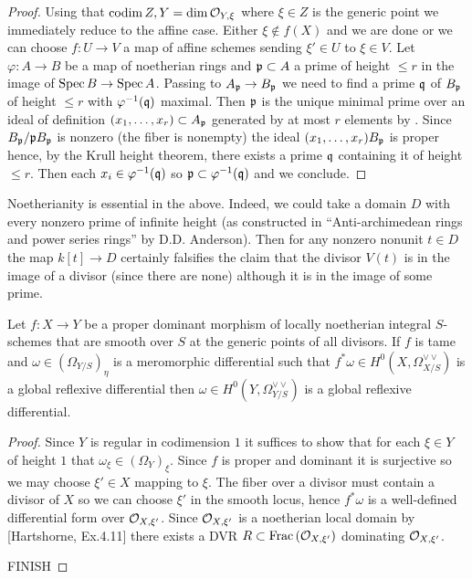 \documentclass[main.tex]{subfiles}
\begin{document}
\begin{proof}
Using that $\operatorname{\mathrm{codim}}{Z,Y} = \dim{\mathcal{O}_{Y, \xi}}$ where $\xi \in Z$ is the generic point we immediately reduce to the affine case. Either $\xi \notin f(X)$ and we are done or we can choose $f : U \to V$ a map of affine schemes sending $\xi' \in U$ to $\xi \in V$. Let $\varphi : A \to B$ be a map of noetherian rings and $\mathfrak{p} \subset A$ a prime of height $\le r$ in the image of $\operatorname{\mathrm{Spec}}{B} \to \operatorname{\mathrm{Spec}}{A}$. Passing to $A_{\mathfrak{p}} \to B_{\mathfrak{p}}$ we need to find a prime $\mathfrak{q}$ of $B_{\mathfrak{p}}$ of height $\le r$ with $\varphi^{-1}(\mathfrak{q})$ maximal. Then $\mathfrak{p}$ is the unique minimal prime over an ideal of definition $(x_1, \dots, x_r) \subset A_{\mathfrak{p}}$ generated by at most $r$ elements by . Since $B_{\mathfrak{p}} / \mathfrak{p} B_{\mathfrak{p}}$ is nonzero (the fiber is nonempty) the ideal $(x_1, \dots, x_r) B_{\mathfrak{p}}$ is proper hence, by the Krull height theorem, there exists a prime $\mathfrak{q}$ containing it of height $\le r$. Then each $x_i \in \varphi^{-1}(\mathfrak{q})$ so $\mathfrak{p} \subset \varphi^{-1}(\mathfrak{q})$ and we conclude.
\end{proof}

\begin{example}
Noetherianity is essential in the above. Indeed, we could take a domain $D$ with every nonzero prime of infinite height (as constructed in ``Anti-archimedean rings and power series rings'' by D.D. Anderson). Then for any nonzero nonunit $t \in D$ the map $k[t] \to D$ certainly falsifies the claim that the divisor $V(t)$ is in the image of a divisor (since there are none) although it is in the image of some prime.
\end{example}

\begin{prop}
Let $f : X \to Y$ be a proper dominant morphism of locally noetherian integral $S$-schemes that are smooth over $S$ at the generic points of all divisors. If $f$ is tame and $\omega \in (\Omega_{Y/S})_{\eta}$ is a meromorphic differential such that $f^* \omega \in H^0(X, \Omega_{X/S}^{\vee \vee})$ is a global reflexive differential then $\omega \in H^0(Y, \Omega_{Y/S}^{\vee \vee})$ is a global reflexive differential.
\end{prop}

\begin{proof}
Since $Y$ is regular in codimension $1$ it suffices to show that for each $\xi \in Y$ of height $1$ that $\omega_\xi \in (\Omega_Y)_{\xi}$. Since $f$ is proper and dominant it is surjective so we may choose $\xi' \in X$ mapping to $\xi$. The fiber over a divisor must contain a divisor of $X$ so we can choose $\xi'$ in the smooth locus, hence $f^* \omega$ is a well-defined differential form over $\mathcal{O}_{X, \xi'}$.  Since $\mathcal{O}_{X, \xi'}$ is a noetherian local domain by [Hartshorne, Ex.4.11] there exists a DVR $R \subset \mathrm{Frac}\left(\mathcal{O}_{X, \xi'}\right)$ dominating $\mathcal{O}_{X, \xi'}$.

{\color{red} FINISH}

\end{proof}
\end{document}

